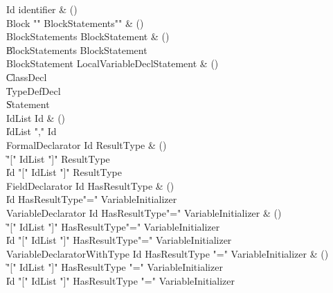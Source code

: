 \begin{bbgrammar}

 Id  \label{prod:Id}  \: identifier & ()\\
 Block  \label{prod:Block}  \: \xcd"{" BlockStatements\opt \xcd"}" & ()\\
 BlockStatements  \label{prod:BlockStatements}  \: BlockStatement & ()\\
    \| BlockStatements BlockStatement\\
 BlockStatement  \label{prod:BlockStatement}  \: LocalVariableDeclStatement & ()\\
    \| ClassDecl\\
    \| TypeDefDecl\\
    \| Statement\\
 IdList  \label{prod:IdList}  \: Id & ()\\
    \| IdList \xcd"," Id\\
 FormalDeclarator  \label{prod:FormalDeclarator}  \: Id ResultType & ()\\
    \| \xcd"[" IdList \xcd"]" ResultType\\
    \| Id \xcd"[" IdList \xcd"]" ResultType\\
 FieldDeclarator  \label{prod:FieldDeclarator}  \: Id HasResultType & ()\\
    \| Id HasResultType\opt \xcd"=" VariableInitializer\\
 VariableDeclarator  \label{prod:VariableDeclarator}  \: Id HasResultType\opt \xcd"=" VariableInitializer & ()\\
    \| \xcd"[" IdList \xcd"]" HasResultType\opt \xcd"=" VariableInitializer\\
    \| Id \xcd"[" IdList \xcd"]" HasResultType\opt \xcd"=" VariableInitializer\\
 VariableDeclaratorWithType  \label{prod:VariableDeclaratorWithType}  \: Id HasResultType \xcd"=" VariableInitializer & ()\\
    \| \xcd"[" IdList \xcd"]" HasResultType \xcd"=" VariableInitializer\\
    \| Id \xcd"[" IdList \xcd"]" HasResultType \xcd"=" VariableInitializer\\

\end{bbgrammar}
